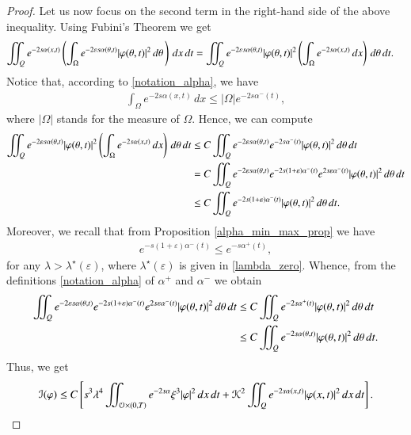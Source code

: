 \documentclass[preprint,1p]{elsarticle}
\newcommand{\intd}{\displaystyle\int \kern -7pt \int}
\begin{document}
\begin{proof}
Let us now focus on the second term in the right-hand side of the above inequality. Using Fubini's Theorem we get
\begin{align*}
	\intd_Q e^{-2s\alpha(x,t)} & \left(\int_{\Omega} e^{-2\varepsilon s\alpha(\theta,t)}|\varphi(\theta,t)|^2\,d\theta\,\right)\,dx\,dt = \intd_Q e^{-2\varepsilon s\alpha(\theta,t)}|\varphi(\theta,t)|^2\left(\int_\Omega e^{-2s\alpha(x,t)}\,dx\right)\,d\theta\,dt.
\end{align*}
Notice that, according to \eqref{notation_alpha}, we have
\begin{align*}
	\int_\Omega e^{-2s\alpha(x,t)}\,dx \leq |\Omega| e^{-2s\alpha^-(t)},
\end{align*}
where $|\Omega|$ stands for the measure of $\Omega$. Hence, we can compute
\begin{align*}
	\intd_Q e^{-2\varepsilon s\alpha(\theta,t)}|\varphi(\theta,t)|^2\left(\int_\Omega e^{-2s\alpha(x,t)}\,dx\right)\,d\theta\,dt & \leq C \intd_Q e^{-2\varepsilon s\alpha(\theta,t)}e^{-2s\alpha^-(t)}|\varphi(\theta,t)|^2\,d\theta\,dt
	\\
	& = C \intd_Q e^{-2\varepsilon s\alpha(\theta,t)}e^{-2s(1+\varepsilon)\alpha^-(t)}e^{2s\varepsilon\alpha^-(t)}|\varphi(\theta,t)|^2\,d\theta\,dt
	\\
	& \leq C \intd_Q e^{-2s(1+\varepsilon)\alpha^-(t)}|\varphi(\theta,t)|^2\,d\theta\,dt.
\end{align*}	
Moreover, we recall that from Proposition \ref{alpha_min_max_prop} we have 
\begin{align*}
	e^{-s(1+\varepsilon)\alpha^-(t)}\leq e^{-s\alpha^+(t)},
\end{align*}
for any $\lambda >\lambda^\star(\varepsilon)$, where $\lambda^\star(\varepsilon)$ is given in \eqref{lambda_zero}. Whence, from the definitions \eqref{notation_alpha} of $\alpha^+$ and $\alpha^-$ we obtain
\begin{align*}
	\intd_Q e^{-2\varepsilon s\alpha(\theta,t)} e^{-2s(1+\varepsilon)\alpha^-(t)}  e^{2s\varepsilon\alpha^-(t)}|\varphi(\theta,t)|^2\,d\theta\,dt & \leq C \intd_Q e^{-2s\alpha^+(t)}|\varphi(\theta,t)|^2\,d\theta\,dt
	\\
	& \leq C \intd_Q e^{-2s\alpha(\theta,t)}|\varphi(\theta,t)|^2\,d\theta\,dt.
\end{align*}
Thus, we get
\begin{align*}
	\mathcal{I}(\varphi) \leq C \left[s^3\lambda^4\intd_{\mathcal O\times(0,T)} e^{-2s\alpha}\xi^3 |\varphi|^2\,dx\,dt + \mathcal{K}^2\intd_Q e^{-2s\alpha(x,t)}|\varphi(x,t)|^2\,dx\,dt\right].

\end{align*}
\end{proof}
\end{document}
